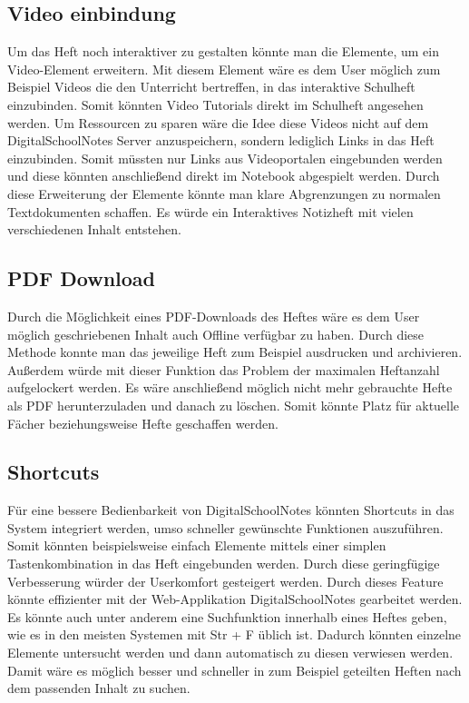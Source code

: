 \subsection{Video einbindung}
Um das Heft noch interaktiver zu gestalten könnte man die Elemente, um ein Video-Element erweitern. Mit diesem Element wäre es dem User möglich zum Beispiel Videos die den Unterricht bertreffen, in das interaktive Schulheft einzubinden. Somit könnten Video Tutorials direkt im Schulheft angesehen werden. Um Ressourcen zu sparen wäre die Idee diese Videos nicht auf dem DigitalSchoolNotes Server anzuspeichern, sondern lediglich Links in das Heft einzubinden. Somit müssten nur Links aus Videoportalen eingebunden werden und diese könnten anschließend direkt im Notebook abgespielt werden. Durch diese Erweiterung der Elemente könnte man klare Abgrenzungen zu normalen Textdokumenten schaffen. Es würde ein Interaktives Notizheft mit vielen verschiedenen Inhalt entstehen. 
\subsection{PDF Download}
Durch die Möglichkeit eines PDF-Downloads des Heftes wäre es dem User möglich geschriebenen Inhalt auch Offline verfügbar zu haben. Durch diese Methode konnte man das jeweilige Heft zum Beispiel ausdrucken und archivieren. Außerdem würde mit dieser Funktion das Problem der maximalen Heftanzahl aufgelockert werden. Es wäre anschließend möglich nicht mehr gebrauchte Hefte als PDF herunterzuladen und danach zu löschen. Somit könnte Platz für aktuelle Fächer beziehungsweise Hefte geschaffen werden.
\subsection{Shortcuts}
Für eine bessere Bedienbarkeit von DigitalSchoolNotes könnten Shortcuts in das System integriert werden, umso schneller gewünschte Funktionen auszuführen. Somit könnten beispielsweise einfach Elemente mittels einer simplen Tastenkombination in das Heft eingebunden werden. Durch diese geringfügige Verbesserung würder der Userkomfort gesteigert werden. Durch dieses Feature könnte effizienter mit der Web-Applikation DigitalSchoolNotes gearbeitet werden.\\
Es könnte auch unter anderem eine Suchfunktion innerhalb eines Heftes geben, wie es in den meisten Systemen mit Str + F üblich ist. Dadurch könnten einzelne Elemente untersucht werden und dann automatisch zu diesen verwiesen werden. Damit wäre es möglich besser und schneller in zum Beispiel geteilten Heften nach dem passenden Inhalt zu suchen. 
\\\\
